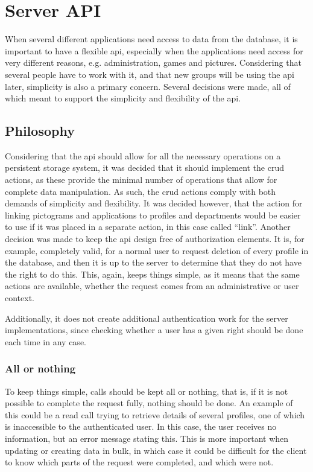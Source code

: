 \section{Server API}

When several different applications need access to data from the database, it is important to have a flexible \ac{api}, especially when 
the applications need access for very different reasons, e.g. administration, games and pictures. Considering that several people have to
work with it, and that new groups will be using the \ac{api} later, simplicity is also a primary concern. Several decisions were made, all of
which meant to support the simplicity and flexibility of the \ac{api}.

\subsection{Philosophy}

Considering that the \ac{api} should allow for all the necessary operations on a persistent storage system, it was decided that it should
implement the \ac{crud} actions, as these provide the minimal number of operations that allow for complete data manipulation. \citep{crud13}
As such, the \ac{crud} actions comply with both demands of simplicity and flexibility. It was decided however, that the action for linking pictograms
and applications to profiles and departments would be easier to use if it was placed in a separate action, in this case called ``link''.\p
Another decision was made to keep the \ac{api} design free of authorization elements. It is, for example, completely valid, for a normal user
to request deletion of every profile in the database, and then it is up to the server to determine that they do not have the right to do this.
This, again, keeps things simple, as it means that the same actions are available, whether the request comes from an administrative or
user context.

Additionally, it does not create additional authentication work for the server implementations, since checking whether a user has a given right
should be done each time in any case.

\subsubsection*{All or nothing}

To keep things simple, calls should be kept all or nothing, that is, if it is not possible to complete the request fully, nothing should be done.
An example of this could be a read call trying to retrieve details of several profiles, one of which is inaccessible to the authenticated user. In this case, the
user receives no information, but an error message stating this. This is more important when updating or creating data in bulk, in which case
it could be difficult for the client to know which parts of the request were completed, and which were not.

